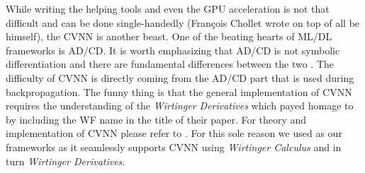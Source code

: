 While writing the helping tools and even the \ac{GPU} acceleration is not that difficult and can be done single-handedly
(Fran\c{c}ois Chollet wrote \keras\cite{Chollet2023} on top of \tensorflow\cite{Abadi2016} all be himself), the \ac{CVNN} is another beast. 
One of the beating hearts of \ac{ML}/\ac{DL} frameworks is \ac{AD}/\ac{CD}. It is worth emphasizing that \ac{AD}/\ac{CD} is not symbolic differentiation and there are fundamental differences between the two \cite{Naumann2011}\cite{Griewank2008}. 
The difficulty of \ac{CVNN}\cite{CTOBYZDSSSJFSSMNRYBCP2017}\cite{Bassey2021}\cite{Barrachina2023} is directly coming from the \ac{AD}/\ac{CD} part 
that is used during backpropagation. The funny thing is that the general implementation of \ac{CVNN} requires the understanding of the 
\emph{Wirtinger Derivatives}\cite{Wirtinger1927} which \cite{Candes2014} payed homage to by including the \ac{WF} name in the title of their paper\cite{Candes2014}. 
For theory and implementation of \ac{CVNN} please refer to \cite{Wirtinger1927}\cite{KreutzDelgado2009}\cite{Bassey2021}\cite{Barrachina2023}\cite{CTOBYZDSSSJFSSMNRYBCP2017}. For this sole reason 
we used \pytorch\cite{Paszke2019} as our frameworks as it seamlessly supports \ac{CVNN} using \emph{Wirtinger Calculus}\cite{Fischer2002} and in turn 
\emph{Wirtinger Derivatives}\cite{Wirtinger1927}.






